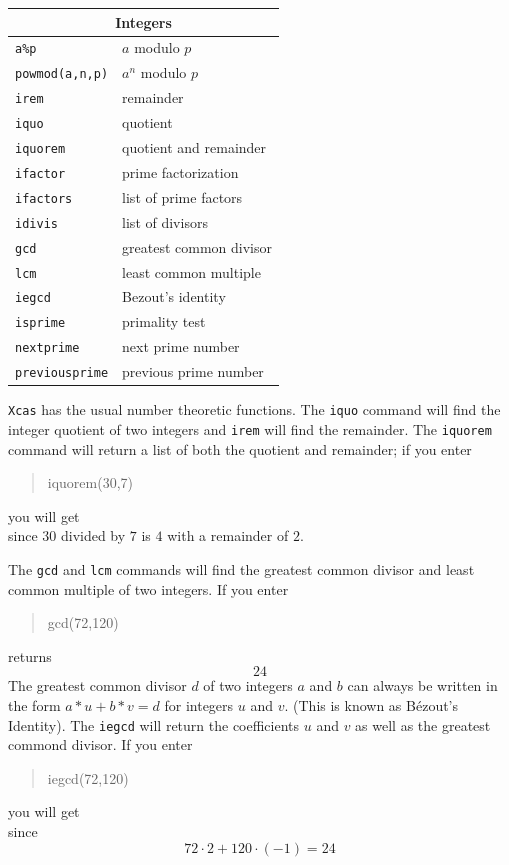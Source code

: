 \documentclass{article}
\newcommand{\xcasin}[1]
{\begin{quote}\ttfamily
#1
\end{quote}}
\newcommand{\xcasout}[1]
{\begin{equation*}
#1
\end{equation*}}
\begin{document}
\begin{center}
\begin{tabular}{|p{}|p{}|}
\hline
\multicolumn{2}{|c|}{\textbf{Integers}}\\
\hline\hline
\texttt{a\%p} & $a$ modulo $p$\\
\texttt{powmod(a,n,p)} & $a^n$ modulo $p$\\
\texttt{irem} & remainder\\
\texttt{iquo} & quotient\\
\texttt{iquorem} & quotient and remainder\\
\hline
\texttt{ifactor} & prime factorization\\
\texttt{ifactors} & list of prime factors\\
\texttt{idivis} & list of divisors\\
\hline
\texttt{gcd} & greatest common divisor\\
\texttt{lcm} & least common multiple\\
\texttt{iegcd} & Bezout's identity\\
\hline
\texttt{isprime} & primality test\\
\texttt{nextprime} & next prime number\\
\texttt{previousprime} & previous prime number\\
\hline
\end{tabular}
\end{center}

\texttt{Xcas} has the usual number theoretic functions.  The
\texttt{iquo} command will find the integer quotient of two integers
and \texttt{irem} will find the remainder.  The \texttt{iquorem}
command will return a list of both the quotient and remainder; if you
enter
\xcasin{iquorem(30,7)}
you will get
\xcasout{[4,2]}
since $30$ divided by $7$ is $4$ with a remainder of $2$.

The \texttt{gcd} and \texttt{lcm} commands will find the greatest
common divisor and least common multiple of two integers.  If you enter
\xcasin{gcd(72,120)}
returns 
\xcasout{24}
The greatest common divisor $d$ of two integers $a$ and $b$ can always be
written in the form $a*u + b*v = d$ for integers $u$ and $v$.  (This
is known as B\'ezout's Identity).  The \texttt{iegcd} will
return the coefficients $u$ and $v$ as well as the greatest commond
divisor.  If you enter
\xcasin{iegcd(72,120)}
you will get
\xcasout{[2,-1,24]}
since
\[ 72\cdot 2 + 120\cdot(-1) = 24\]
\end{document}

